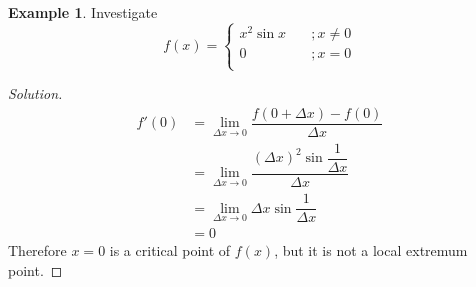 \documentclass[fleqn]{article}
\theoremstyle{definition}
\newtheorem{example}{Example}
\theoremstyle{theorem}
\theoremstyle{remark}
\newenvironment{solution}
{\begin{proof}[Solution]\let\qed\relax}
	{\end{proof}}
\begin{document}
\begin{example}
	Investigate
	\begin{equation*}
		f(x) = 
		\begin{cases}
			x^2 \sin x &\quad; x \neq 0\\
			0 &\quad; x = 0\\
		\end{cases}
	\end{equation*}
\end{example}

\begin{solution}
	\begin{align*}
		f'(0) &= \lim\limits_{\Delta x \to 0} \dfrac{f(0 + \Delta x) - f(0)}{\Delta x}\\
		&= \lim\limits_{\Delta x \to 0} \dfrac{(\Delta x)^2 \sin \dfrac{1}{\Delta x}}{\Delta x}\\
		&= \lim\limits_{\Delta x \to 0} \Delta x \sin \dfrac{1}{\Delta x}\\
		&= 0
	\end{align*}
	Therefore $x = 0$ is a critical point of $f(x)$, but it is not a local extremum point.
\end{solution}
\end{document}
